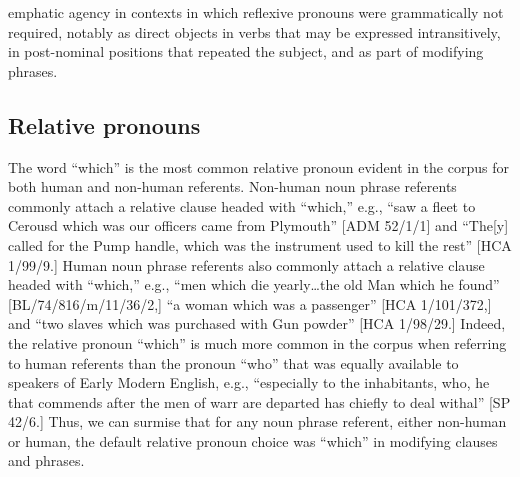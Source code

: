 emphatic agency in contexts in which reflexive pronouns were grammatically not required, notably as direct objects in verbs that may be expressed intransitively, in post-nominal positions that repeated the subject, and as part of modifying phrases. 

\subsection{{Relative} {pronouns}}%

  The word “which” is the most common relative pronoun evident in the corpus for both human and non-human referents. Non-human noun phrase referents commonly attach a relative clause headed with “which,” e.g., “saw a fleet to Cerousd which was our officers came from Plymouth” [ADM 52/1/1] and “The[y] called for the Pump handle, which was the instrument used to kill the rest” [HCA 1/99/9.] Human noun phrase referents also commonly attach a relative clause headed with “which,” e.g., “men which die yearly…the old Man which he found” [BL/74/816/m/11/36/2,] “a woman which was a passenger” [HCA 1/101/372,] and “two slaves which was purchased with Gun powder” [HCA 1/98/29.] Indeed, the relative pronoun “which” is much more common in the corpus when referring to human referents than the pronoun “who” that was equally available to speakers of Early Modern English, e.g., “especially to the inhabitants, who, he that commends after the men of warr are departed has chiefly to deal withal” [SP 42/6.] Thus, we can surmise that for any noun phrase referent, either non-human or human, the default relative pronoun choice was “which” in modifying clauses and phrases. 

